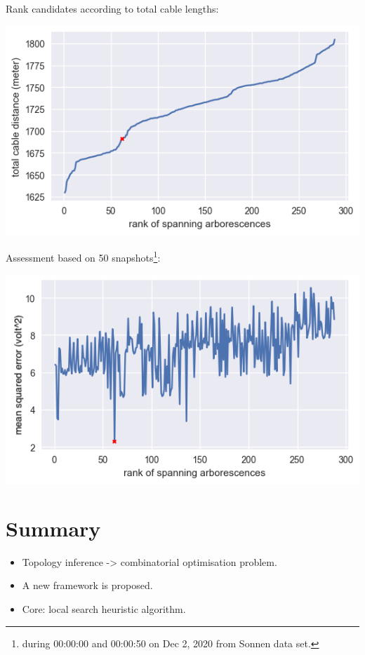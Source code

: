 \documentclass[
]{book}
\providecommand{\tightlist}{%
  \setlength{\itemsep}{0pt}\setlength{\parskip}{0pt}}
\begin{document}
Rank candidates according to total cable lengths:

\begin{center}\includegraphics{Pictures/distances_288} \end{center}

Assessment based on 50 snapshots\footnote{during 00:00:00 and 00:00:50 on Dec 2, 2020
  from Sonnen data set.}:

\begin{center}\includegraphics{Pictures/errors_288} \end{center}

\hypertarget{summary}{%
\section{Summary}\label{summary}}

\begin{itemize}
\tightlist
\item
  Topology inference -\textgreater{} combinatorial optimisation problem.
\item
  A new framework is proposed.
\item
  Core: local search heuristic algorithm.
\end{itemize}
\end{document}
